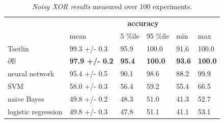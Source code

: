 \documentclass{article}
\theoremstyle{plain}
\theoremstyle{definition}
\theoremstyle{remark}
\begin{document}
\begin{table}[t]
	\centering
	\begin{tabular}{llllll}
		\cline{2-6}
		\multicolumn{1}{c}{}                       & \multicolumn{5}{c}{\textbf{accuracy}}                                                                                                                                                            \\ \cline{2-6} 
		\multicolumn{1}{l|}{}                      & \multicolumn{1}{l|}{mean}                  & \multicolumn{1}{l|}{5 \%ile}       & \multicolumn{1}{l|}{95 \%ile}       & \multicolumn{1}{l|}{min}           & \multicolumn{1}{l|}{max}            \\ \hline
		\multicolumn{1}{|l|}{Tsetlin}              & \multicolumn{1}{l|}{99.3 +/- 0.3}          & \multicolumn{1}{l|}{95.9}          & \multicolumn{1}{l|}{100.0}          & \multicolumn{1}{l|}{91.6}          & \multicolumn{1}{l|}{100.0}          \\ \hline
		\multicolumn{1}{|l|}{$\partial\mathbb{B}$} & \multicolumn{1}{l|}{\textbf{97.9 +/- 0.2}} & \multicolumn{1}{l|}{\textbf{95.4}} & \multicolumn{1}{l|}{\textbf{100.0}} & \multicolumn{1}{l|}{\textbf{93.6}} & \multicolumn{1}{l|}{\textbf{100.0}} \\ \hline
		\multicolumn{1}{|l|}{neural network}       & \multicolumn{1}{l|}{95.4 +/- 0.5}          & \multicolumn{1}{l|}{90.1}          & \multicolumn{1}{l|}{98.6}           & \multicolumn{1}{l|}{88.2}          & \multicolumn{1}{l|}{99.9}           \\ \hline
		\multicolumn{1}{|l|}{SVM}                  & \multicolumn{1}{l|}{58.0 +/- 0.3}          & \multicolumn{1}{l|}{56.4}          & \multicolumn{1}{l|}{59.2}           & \multicolumn{1}{l|}{55.4}          & \multicolumn{1}{l|}{66.5}           \\ \hline
		\multicolumn{1}{|l|}{naive Bayes}          & \multicolumn{1}{l|}{49.8 +/- 0.2}          & \multicolumn{1}{l|}{48.3}          & \multicolumn{1}{l|}{51.0}           & \multicolumn{1}{l|}{41.3}          & \multicolumn{1}{l|}{52.7}           \\ \hline
		\multicolumn{1}{|l|}{logistic regression}  & \multicolumn{1}{l|}{49.8 +/- 0.3}          & \multicolumn{1}{l|}{47.8}          & \multicolumn{1}{l|}{51.1}           & \multicolumn{1}{l|}{41.1}          & \multicolumn{1}{l|}{53.1}           \\ \hline
	\end{tabular}
	\caption{{\em Noisy XOR results}  measured over 100 experiments.}
	\label{tab:noisy-xor-results}
\end{table}
\end{document}
